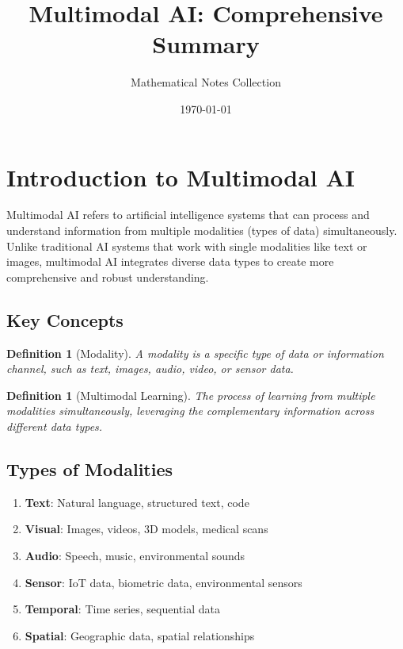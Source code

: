 \documentclass[11pt,a4paper]{article}
\title{Multimodal AI: Comprehensive Summary}
\author{Mathematical Notes Collection}
\date{\today}
\newtheorem{definition}[theorem]{Definition}
\begin{document}
\maketitle
\tableofcontents
\newpage

\section{Introduction to Multimodal AI}

Multimodal AI refers to artificial intelligence systems that can process and understand information from multiple modalities (types of data) simultaneously. Unlike traditional AI systems that work with single modalities like text or images, multimodal AI integrates diverse data types to create more comprehensive and robust understanding.

\subsection{Key Concepts}

\begin{definition}[Modality]
A modality is a specific type of data or information channel, such as text, images, audio, video, or sensor data.
\end{definition}

\begin{definition}[Multimodal Learning]
The process of learning from multiple modalities simultaneously, leveraging the complementary information across different data types.
\end{definition}

\subsection{Types of Modalities}

\begin{enumerate}
\item \textbf{Text}: Natural language, structured text, code
\item \textbf{Visual}: Images, videos, 3D models, medical scans
\item \textbf{Audio}: Speech, music, environmental sounds
\item \textbf{Sensor}: IoT data, biometric data, environmental sensors
\item \textbf{Temporal}: Time series, sequential data
\item \textbf{Spatial}: Geographic data, spatial relationships
\end{enumerate}
\end{document}
